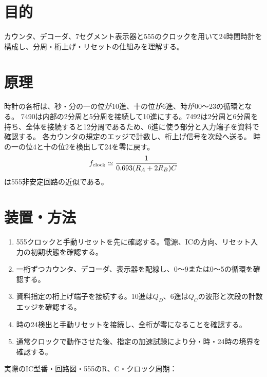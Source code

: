 \documentclass[lualatex,a4paper,10pt]{jlreq}
\begin{document}
\reporttitle
{}

\section{目的}\label{sec:auto1}
カウンタ、デコーダ、7セグメント表示器と555のクロックを用いて24時間時計を構成し、分周・桁上げ・リセットの仕組みを理解する。
\section{原理}\label{sec:auto2}
時計の各桁は、秒・分の一の位が10進、十の位が6進、時が00〜23の循環となる。
7490は内部の2分周と5分周を接続して10進にする。7492は2分周と6分周を持ち、全体を接続すると12分周であるため、6進に使う部分と入力端子を資料で確認する。
各カウンタの規定のエッジで計数し、桁上げ信号を次段へ送る。
時の一の位4と十の位2を検出して24を零に戻す。
\[
 f_{\rm clock}\simeq\frac1{0.693(R_A+2R_B)C}
\]
は555非安定回路の近似である。
\section{装置・方法}\label{sec:auto3}
\begin{enumerate}
\item 555クロックと手動リセットを先に確認する。電源、ICの方向、リセット入力の初期状態を確認する。
\item 一桁ずつカウンタ、デコーダ、表示器を配線し、0〜9または0〜5の循環を確認する。
\item 資料指定の桁上げ端子を接続する。10進は$Q_D$、6進は$Q_C$の波形と次段の計数エッジを確認する。
\item 時の24検出と手動リセットを接続し、全桁が零になることを確認する。
\item 通常クロックで動作させた後、指定の加速試験により分・時・24時の境界を確認する。
\end{enumerate}
実際のIC型番・回路図・555のR、C・クロック周期：
\writing{22mm}
\clearpage
\end{document}

